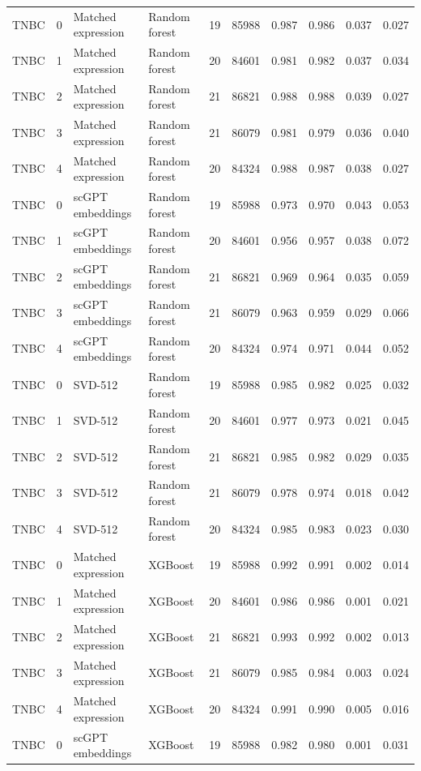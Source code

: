 {\begin{longtable}{lrllrrrrrr}
TNBC & 0 & Matched expression & Random forest & 19 & 85988 & 0.987 & 0.986 & 0.037 & 0.027 \\
TNBC & 1 & Matched expression & Random forest & 20 & 84601 & 0.981 & 0.982 & 0.037 & 0.034 \\
TNBC & 2 & Matched expression & Random forest & 21 & 86821 & 0.988 & 0.988 & 0.039 & 0.027 \\
TNBC & 3 & Matched expression & Random forest & 21 & 86079 & 0.981 & 0.979 & 0.036 & 0.040 \\
TNBC & 4 & Matched expression & Random forest & 20 & 84324 & 0.988 & 0.987 & 0.038 & 0.027 \\
TNBC & 0 & scGPT embeddings & Random forest & 19 & 85988 & 0.973 & 0.970 & 0.043 & 0.053 \\
TNBC & 1 & scGPT embeddings & Random forest & 20 & 84601 & 0.956 & 0.957 & 0.038 & 0.072 \\
TNBC & 2 & scGPT embeddings & Random forest & 21 & 86821 & 0.969 & 0.964 & 0.035 & 0.059 \\
TNBC & 3 & scGPT embeddings & Random forest & 21 & 86079 & 0.963 & 0.959 & 0.029 & 0.066 \\
TNBC & 4 & scGPT embeddings & Random forest & 20 & 84324 & 0.974 & 0.971 & 0.044 & 0.052 \\
TNBC & 0 & SVD-512 & Random forest & 19 & 85988 & 0.985 & 0.982 & 0.025 & 0.032 \\
TNBC & 1 & SVD-512 & Random forest & 20 & 84601 & 0.977 & 0.973 & 0.021 & 0.045 \\
TNBC & 2 & SVD-512 & Random forest & 21 & 86821 & 0.985 & 0.982 & 0.029 & 0.035 \\
TNBC & 3 & SVD-512 & Random forest & 21 & 86079 & 0.978 & 0.974 & 0.018 & 0.042 \\
TNBC & 4 & SVD-512 & Random forest & 20 & 84324 & 0.985 & 0.983 & 0.023 & 0.030 \\
TNBC & 0 & Matched expression & XGBoost & 19 & 85988 & 0.992 & 0.991 & 0.002 & 0.014 \\
TNBC & 1 & Matched expression & XGBoost & 20 & 84601 & 0.986 & 0.986 & 0.001 & 0.021 \\
TNBC & 2 & Matched expression & XGBoost & 21 & 86821 & 0.993 & 0.992 & 0.002 & 0.013 \\
TNBC & 3 & Matched expression & XGBoost & 21 & 86079 & 0.985 & 0.984 & 0.003 & 0.024 \\
TNBC & 4 & Matched expression & XGBoost & 20 & 84324 & 0.991 & 0.990 & 0.005 & 0.016 \\
TNBC & 0 & scGPT embeddings & XGBoost & 19 & 85988 & 0.982 & 0.980 & 0.001 & 0.031 \\

\end{longtable}}
